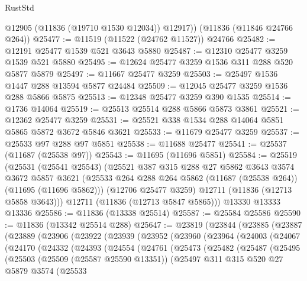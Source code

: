 \begin{lexlean}{RustStd}
\begin{coremodule}
        @12905
        (@11836 (@19710 @1530 @12034))
        @12917))
    (@11836 (@11846 @24766 @264))
@25477 := @11519 (@11522 (@24762 @11527)) @24766
@25482 := @12191 @25477 @1539 @521 @3643 @5880
@25487 := @12310 @25477 @3259 @1539 @521 @5880
@25495 := @12624 @25477 @3259 @1536 @311 @288 @520 @5877 @5879
@25497 := @11667 @25477 @3259
@25503 := @25497 @1536 @1447 @288 @13594 @5877 @24484
@25509 := @12045 @25477 @3259 @1536 @288 @5866 @5875
@25513 := @12348 @25477 @3259 @390 @1535
@25514 := @1736 @14064
@25519 := @25513 @25514 @288 @5866 @5873 @3861
@25521 := @12362 @25477 @3259
@25531 := @25521 @338 @1534 @288 @14064 @5851 @5865 @5872 @3672 @5846 @3621
@25533 := @11679 @25477 @3259
@25537 := @25533 @97 @288 @97 @5851
@25538 := @11688 @25477
@25541 := @25537 (@11687 (@25538 @97))
@25543 := @11695 (@11696 @5851)
@25584 := @25519
    (@25531
      (@25541 @25543)
      (@25521
        @387
        @315
        @288
        @27
        @5862
        @3643
        @3574
        @3672
        @5857
        @3621
        (@25533 @264 @288 @264 @5862 (@11687 (@25538 @264)) (@11695 (@11696 @5862)))
        (@12706 @25477 @3259)
        @12711
        (@11836 (@12713 @5858 @3643)))
      @12711
      (@11836 (@12713 @5847 @5865)))
    @13330
    @13333
    @13336
@25586 := @11836 (@13338 @25514)
@25587 := @25584 @25586
@25590 := @11836 (@13342 @25514 @288)
@25647 := @23819
    (@23844
      (@23885
        (@23887
          (@23889
            (@23906
              (@23922
                (@23939
                  (@23952
                    (@23960
                      (@23964
                        (@24003
                          (@24067
                            (@24170
                              (@24332
                                (@24393
                                  (@24554
                                    (@24761
                                      (@25473
                                        (@25482
                                          (@25487
                                            (@25495
                                              (@25503
                                                (@25509 (@25587 @25590 @13351))
                                                (@25497
                                                  @311
                                                  @315
                                                  @520
                                                  @27
                                                  @5879
                                                  @3574
                                                  (@25533

\end{coremodule}
\end{lexlean}
